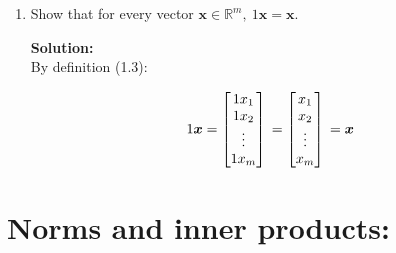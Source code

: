 \documentclass[]{article}
\newcommand{\solution}{\vskip 0.5cm \textbf{\large Solution:} \\}
\begin{document}
\begin{enumerate}
\item Show that for every vector $\bm{x}\in\mathbb{R}^m,~ 1\bm{x}=\bm{x}$.

  \solution
  By definition (1.3):

  \[
      1 \bm{x} =
      \begin{bmatrix}
        1 x_{1} \\
        1 x_{2} \\
        \vdots \\
        1 x_{m}
      \end{bmatrix} \\
      =
      \begin{bmatrix}
        x_{1} \\
        x_{2} \\
        \vdots \\
        x_{m}
      \end{bmatrix} \\
      = \bm{x}
  \]  

\end{enumerate}


\section*{Norms and inner products:}
\end{document}
